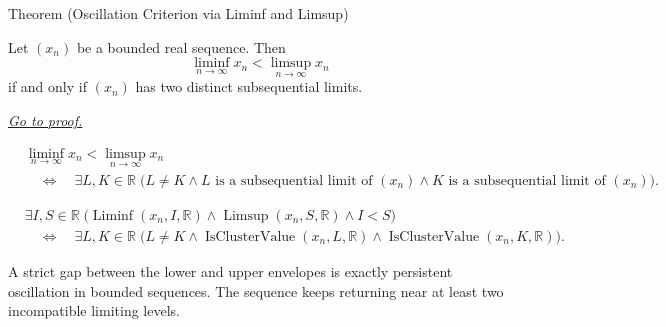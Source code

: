 
\begin{theorembox}{Theorem (Oscillation Criterion via Liminf and Limsup)}
\begin{theorem}
\label{thm:oscillation-criterion-via-liminf-limsup}
Let $(x_n)$ be a bounded real sequence. Then
\[
  \liminf_{n\to\infty}x_n
  <
  \limsup_{n\to\infty}x_n
\]
if and only if $(x_n)$ has two distinct subsequential limits.

\smallskip
\noindent
\hyperref[prf:oscillation-criterion-via-liminf-limsup]{\textit{Go to proof.}}
\end{theorem}
\end{theorembox}

\begin{remark*}
\[
\begin{aligned}
&\liminf_{n\to\infty}x_n<\limsup_{n\to\infty}x_n\\
&\quad\Longleftrightarrow\quad
\exists L,K\in\mathbb{R}\;
\bigl(
  L\ne K
  \land L\text{ is a subsequential limit of }(x_n)
  \land K\text{ is a subsequential limit of }(x_n)
\bigr).
\end{aligned}
\]
\end{remark*}

\begin{remark*}
\[
\begin{aligned}
&\exists I,S\in\mathbb{R}\;
\bigl(
  \operatorname{Liminf}(x_n,I,\mathbb{R})
  \land
  \operatorname{Limsup}(x_n,S,\mathbb{R})
  \land I<S
\bigr)\\
&\quad\Longleftrightarrow\quad
\exists L,K\in\mathbb{R}\;
\bigl(
  L\ne K
  \land \operatorname{IsClusterValue}(x_n,L,\mathbb{R})
  \land \operatorname{IsClusterValue}(x_n,K,\mathbb{R})
\bigr).
\end{aligned}
\]
\end{remark*}

\begin{remark*}[Interpretation]
A strict gap between the lower and upper envelopes is exactly persistent
oscillation in bounded sequences. The sequence keeps returning near at least
two incompatible limiting levels.
\end{remark*}

